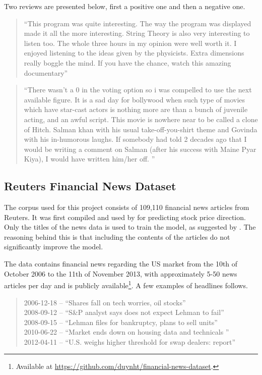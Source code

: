 Two reviews are presented below, first a positive one and then a negative one. 

\begin{quote}
    ``This program was quite interesting. The way the program was displayed made it all the more interesting. String Theory is also very interesting to listen too. The whole three hours in my opinion were well worth it. I enjoyed listening to the ideas given by the physicists. Extra dimensions really boggle the mind. If you have the chance, watch this amazing documentary'' 
\end{quote}
\begin{quote}
    ``There wasn't a 0 in the voting option so i was compelled to use the next available figure. It is a sad day for bollywood when such type of movies which have star-cast actors is nothing more are than a bunch of juvenile acting, and an awful script. This movie is nowhere near to be called a clone of Hitch. Salman khan with his usual take-off-you-shirt theme and Govinda with his in-humorous laughs. If somebody had told 2 decades ago that I would be writing a comment on Salman (after his success with Maine Pyar Kiya), I would have written him/her off. ''
\end{quote}

\subsection{Reuters Financial News Dataset}

The corpus used for this project consists of 109,110 financial news articles from Reuters. It was first compiled and used by \citet{ding2014using} for predicting stock price direction. Only the titles of the news data is used to train the model, as suggested by \citet{ding2014using}. The reasoning behind this is that including the contents of the articles do not significantly improve the model. 

The data contains financial news regarding the US market from the 10th of October 2006 to the 11th of November 2013, with approximately 5-50 news articles per day and is publicly available\footnote{Available at \url{https://github.com/duynht/financial-news-dataset}.}. A few examples of headlines follows. 

\begin{quote}
    2006-12-18 -- ``Shares fall on tech worries, oil stocks'' \\
    2008-09-12 -- ``S\&P analyst says does not expect Lehman to fail'' \\
    2008-09-15 -- ``Lehman files for bankruptcy, plans to sell units'' \\ 
    2010-06-22 -- ``Market ends down on housing data and technicals '' \\
    2012-04-11 -- ``U.S. weighs higher threshold for swap dealers: report'' \\
\end{quote}


